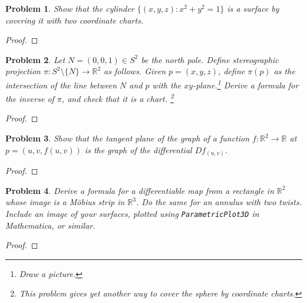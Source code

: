 \documentclass[11pt]{article}
\newtheorem{problem}{Problem}
\begin{document}
\begin{problem}
Show that the cylinder $\{(x,y,z):x^2+y^2=1\}$ is a surface by covering it with two coordinate charts. 
\end{problem}

\begin{proof}

\end{proof}

\pagebreak

\begin{problem}
Let $N=(0,0,1)\in S^2$ be the north pole. Define stereographic projection $\pi: S^2\setminus\{N\}\to \mathbb R^2$ as follows. Given $p=(x,y,z)$, define $\pi(p)$ as the intersection of the line between $N$ and $p$ with the $xy$-plane.\footnote{Draw a picture.} Derive a formula for the inverse of $\pi$, and check that it is a chart.  \footnote{This problem gives yet another way to cover the sphere by coordinate charts.} 
\end{problem}

\begin{proof}

\end{proof}

\pagebreak

\begin{problem}
Show that the tangent plane of the graph of a function $f:\mathbb R^2\to\mathbb R$ at $p=(u,v,f(u,v))$ is the graph of the differential $Df_{(u,v)}$. 
\end{problem}

\begin{proof}

\end{proof}

\pagebreak

\begin{problem}
Derive a formula for a differentiable map from a rectangle in $\mathbb R^2$ whose image is a M\"obius strip in $\mathbb R^3$. Do the same for an annulus with two twists. Include an image of your surfaces, plotted using \texttt{ParametricPlot3D} in Mathematica, or similar. 
\end{problem}


\begin{proof}

\end{proof}
\end{document}
